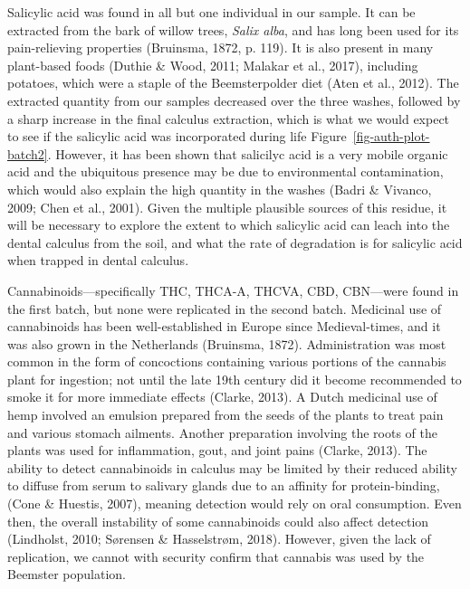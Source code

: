 \documentclass[
]{article}
\begin{document}
Salicylic acid was found in all but one individual in our sample. It can
be extracted from the bark of willow trees, \emph{Salix alba}, and has
long been used for its pain-relieving properties (Bruinsma, 1872, p.
119). It is also present in many plant-based foods (Duthie \& Wood,
2011; Malakar et al., 2017), including potatoes, which were a staple of
the Beemsterpolder diet (Aten et al., 2012). The extracted quantity from
our samples decreased over the three washes, followed by a sharp
increase in the final calculus extraction, which is what we would expect
to see if the salicylic acid was incorporated during life
Figure~\ref{fig-auth-plot-batch2}. However, it has been shown that
salicilyc acid is a very mobile organic acid and the ubiquitous presence
may be due to environmental contamination, which would also explain the
high quantity in the washes (Badri \& Vivanco, 2009; Chen et al., 2001).
Given the multiple plausible sources of this residue, it will be
necessary to explore the extent to which salicylic acid can leach into
the dental calculus from the soil, and what the rate of degradation is
for salicylic acid when trapped in dental calculus.

Cannabinoids---specifically THC, THCA-A, THCVA, CBD, CBN---were found in
the first batch, but none were replicated in the second batch. Medicinal
use of cannabinoids has been well-established in Europe since
Medieval-times, and it was also grown in the Netherlands (Bruinsma,
1872). Administration was most common in the form of concoctions
containing various portions of the cannabis plant for ingestion; not
until the late 19th century did it become recommended to smoke it for
more immediate effects (Clarke, 2013). A Dutch medicinal use of hemp
involved an emulsion prepared from the seeds of the plants to treat pain
and various stomach ailments. Another preparation involving the roots of
the plants was used for inflammation, gout, and joint pains (Clarke,
2013). The ability to detect cannabinoids in calculus may be limited by
their reduced ability to diffuse from serum to salivary glands due to an
affinity for protein-binding, (Cone \& Huestis, 2007), meaning detection
would rely on oral consumption. Even then, the overall instability of
some cannabinoids could also affect detection (Lindholst, 2010; Sørensen
\& Hasselstrøm, 2018). However, given the lack of replication, we cannot
with security confirm that cannabis was used by the Beemster population.
\end{document}
